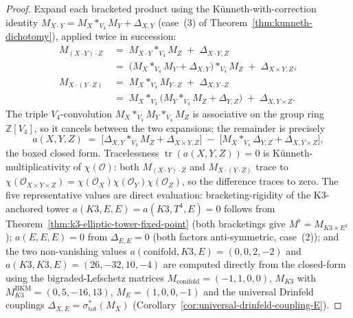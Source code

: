\begin{proof}
Expand each bracketed product using the Künneth-with-correction identity
$M_{X \cdot Y} = M_X *_{V_4} M_Y + \Delta_{X, Y}$
\textup{(}case~(3) of Theorem~\ref{thm:kunneth-dichotomy}\textup{),}
applied twice in succession:
\begin{align*}
 M_{(X \cdot Y) \cdot Z}
 &\;=\; M_{X \cdot Y} *_{V_4} M_Z \;+\; \Delta_{X \cdot Y, Z} \\
 &\;=\; \bigl(M_X *_{V_4} M_Y + \Delta_{X, Y}\bigr) *_{V_4} M_Z
 \;+\; \Delta_{X \times Y, Z}, \\
 M_{X \cdot (Y \cdot Z)}
 &\;=\; M_X *_{V_4} M_{Y \cdot Z} \;+\; \Delta_{X, Y \cdot Z} \\
 &\;=\; M_X *_{V_4} \bigl(M_Y *_{V_4} M_Z + \Delta_{Y, Z}\bigr)
 \;+\; \Delta_{X, Y \times Z}.
\end{align*}
The triple $V_4$-convolution $M_X *_{V_4} M_Y *_{V_4} M_Z$ is associative
on the group ring $\mathbb{Z}[V_4]$, so it cancels between the two
expansions; the remainder is precisely
\[
 a(X, Y, Z)
 \;=\; \bigl[\Delta_{X, Y} *_{V_4} M_Z + \Delta_{X \times Y, Z}\bigr]
 \;-\; \bigl[M_X *_{V_4} \Delta_{Y, Z}
 + \Delta_{X, Y \times Z}\bigr],
\]
the boxed closed form. Tracelessness
$\operatorname{tr}(a(X, Y, Z)) = 0$ is Künneth-multiplicativity of
$\chi(\mathcal{O})$: both $M_{(X \cdot Y) \cdot Z}$ and
$M_{X \cdot (Y \cdot Z)}$ trace to
$\chi(\mathcal{O}_{X \times Y \times Z}) =
\chi(\mathcal{O}_X)\chi(\mathcal{O}_Y)\chi(\mathcal{O}_Z)$, so the
difference traces to zero. The five representative values are direct
evaluation: bracketing-rigidity of the K$3$-anchored tower
$a(K3, E, E) = a(K3, T^4, E) = 0$ follows from
Theorem~\ref{thm:k3-elliptic-tower-fixed-point} (both bracketings give
$M^\flat = M_{K3 \times E^2}$); $a(E, E, E) = 0$ from $\Delta_{E, E} = 0$
(both factors anti-symmetric, case~(2)); and the two non-vanishing values
$a(\mathrm{conifold}, K3, E) = (0, 0, 2, -2)$ and
$a(K3, K3, E) = (26, -32, 10, -4)$ are computed directly from the
closed-form using the bigraded-Lefschetz matrices
$M_{\mathrm{conifold}} = (-1, 1, 0, 0)$, $M_{K3}$ with
$M_{K3}^{\mathrm{BKM}} = (0, 5, -16, 13)$, $M_E = (1, 0, 0, -1)$ and the
universal Drinfeld couplings
$\Delta_{X, E} = \sigma_{\mathrm{tot}}^*(M_X)$
\textup{(}Corollary~\ref{cor:universal-drinfeld-coupling-E}\textup{).}
\end{proof}



